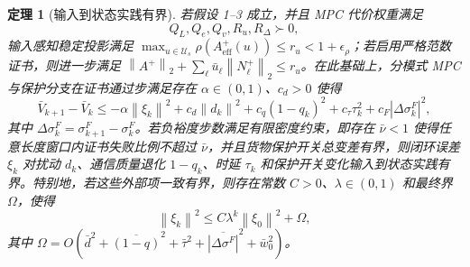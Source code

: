 \documentclass[twocolumn,3p,times,procedia]{elsarticle}
\newcommand{\norm}[1]{\left\lVert #1 \right\rVert}
\newtheorem{theorem}{定理}
\begin{document}
\begin{theorem}[输入到状态实践有界]
若假设 1--3 成立，并且 MPC 代价权重满足
\begin{equation}
Q_L,Q_e,Q_v,R_u,R_\Delta\succ0,
\label{eq:positive_weights}
\end{equation}
输入感知稳定投影满足 $\max_{u\in\mathcal U_s}\rho(A_{\mathrm{eff}}^+(u))\le r_u<1+\epsilon_\rho$；若启用严格范数证书，则进一步满足 $\norm{A^+}_2+\sum_\ell \bar u_\ell\norm{N_\ell^+}_2\le r_u$。在此基础上，分模式 MPC 与保护分支在证书通过步满足存在 $\alpha\in(0,1)$、$c_d>0$ 使得
\begin{equation}
\bar V_{k+1}-\bar V_k\le -\alpha\norm{\xi_k}^2+c_d\norm{d_k}^2+c_q(1-q_k)^2+c_\tau\tau_k^2+c_F|\Delta\sigma_k^F|^2,
\label{eq:iss_difference}
\end{equation}
其中 $\Delta\sigma_k^F=\sigma_{k+1}^F-\sigma_k^F$。若负裕度步数满足有限密度约束，即存在 $\bar \nu<1$ 使得任意长度窗口内证书失败比例不超过 $\bar \nu$，并且货物保护开关总变差有界，则闭环误差 $\xi_k$ 对扰动 $d_k$、通信质量退化 $1-q_k$、时延 $\tau_k$ 和保护开关变化输入到状态实践有界。特别地，若这些外部项一致有界，则存在常数 $C>0$、$\lambda\in(0,1)$ 和最终界 $\Omega$，使得
\begin{equation}
\norm{\xi_k}^2\le C\lambda^k\norm{\xi_0}^2+\Omega ,
\label{eq:uub_bound}
\end{equation}
其中 $\Omega=O(\bar d^2+\overline{(1-q)}^2+\bar\tau^2+\overline{|\Delta\sigma^F|}^2+\bar w_0^2)$。
\end{theorem}
\end{document}
